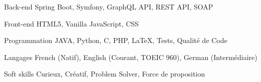 

\begin{cvskills}

\cvskill
  {Back-end} %
  {Spring Boot, Symfony, GraphQL API, REST API, SOAP} %

  \cvskill
    {Front-end} %
    {HTML5, Vanilla JavaScript, CSS} %

  \cvskill
    {Programmation} %
    {JAVA, Python, C, PHP, LaTeX, Tests, Qualité de Code} %

  \cvskill
    {Langages} %
    {French (Natif), English (Courant, TOEIC 960), German (Intermédiaire)} %

  \cvskill
    {Soft skills} %
    {Curieux, Créatif, Problem Solver, Force de proposition} %

\end{cvskills}

